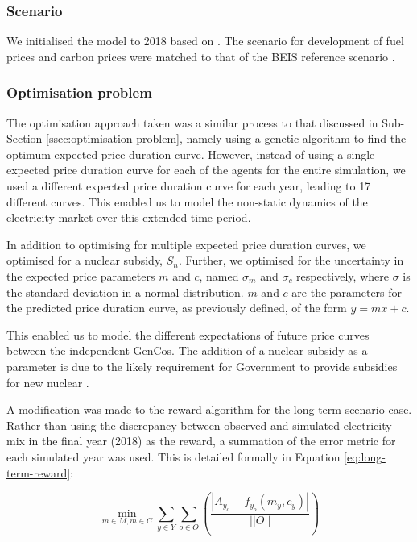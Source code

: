\subsubsection{Scenario}
\label{sssec:scenario-details}

We initialised the model to 2018 based on \cite{Kell}. The scenario for development of fuel prices and carbon prices were matched to that of the BEIS reference scenario \cite{DBEIS2019}.


\subsubsection{Optimisation problem} The optimisation approach taken was a similar process to that discussed in Sub-Section \ref{ssec:optimisation-problem}, namely using a genetic algorithm to find the optimum expected price duration curve. However, instead of using a single expected price duration curve for each of the agents for the entire simulation, we used a different expected price duration curve for each year, leading to 17 different curves. This enabled us to model the non-static dynamics of the electricity market over this extended time period. 

In addition to optimising for multiple expected price duration curves, we optimised for a nuclear subsidy, $S_n$. Further, we optimised for the uncertainty in the expected price parameters $m$ and $c$, named $\sigma_m$ and $\sigma_c$ respectively, where $\sigma$ is the standard deviation in a normal distribution. $m$ and $c$ are the parameters for the predicted price duration curve, as previously defined, of the form $y=mx+c$.  

This enabled us to model the different expectations of future price curves between the independent GenCos. The addition of a nuclear subsidy as a parameter is due to the likely requirement for Government to provide subsidies for new nuclear \cite{Suna2016}.

A modification was made to the reward algorithm for the long-term scenario case. Rather than using the discrepancy between observed and simulated electricity mix in the final year (2018) as the reward, a summation of the error metric for each simulated year was used. This is detailed formally in Equation \ref{eq:long-term-reward}:


\begin{equation}
\label{eq:long-term-reward}
\min_{m\in M,m\in C} 
\sum\limits_{y\in Y}
\sum\limits_{o\in O}\left(
\frac{\left|A_{y_o}-f_{y_o}(m_y,c_y)\right|}
{\left|\left|O\right|\right|}
\right)
\end{equation}

